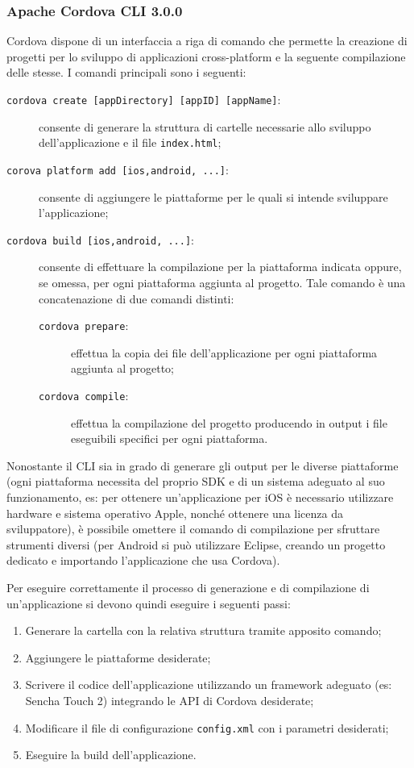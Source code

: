 \subsubsection{Apache Cordova CLI 3.0.0}
Cordova dispone di un interfaccia a riga di comando che permette la creazione di progetti per lo sviluppo di applicazioni cross-platform e la seguente compilazione delle stesse.
I comandi principali sono i seguenti:
\begin{description}
\item[\texttt{cordova create [appDirectory] [appID] [appName]}:] consente di generare la struttura di cartelle necessarie allo sviluppo dell'applicazione e il file \texttt{index.html};
\item[\texttt{corova platform add [ios,android, ...]}:] consente di aggiungere le piattaforme per le quali si intende sviluppare l'applicazione;
\item[\texttt{cordova build [ios,android, ...]}:] consente di effettuare la compilazione per la piattaforma indicata oppure, se omessa, per ogni piattaforma aggiunta al progetto. Tale comando è una concatenazione di due comandi distinti:
	\begin{description}
	\item[\texttt{cordova prepare}:] effettua la copia dei file dell'applicazione per ogni piattaforma aggiunta al progetto;
	\item[\texttt{cordova compile}:] effettua la compilazione del progetto producendo in output i file eseguibili specifici per ogni piattaforma.
	\end{description}
\end{description}

Nonostante il CLI sia in grado di generare gli output per le diverse piattaforme (ogni piattaforma necessita del proprio SDK e di un sistema adeguato al suo funzionamento, es: per ottenere un'applicazione per iOS è necessario utilizzare hardware e sistema operativo Apple, nonché ottenere una licenza da sviluppatore), è possibile omettere il comando di compilazione per sfruttare strumenti diversi (per Android si può utilizzare Eclipse, creando un progetto dedicato e importando l'applicazione che usa Cordova).

Per eseguire correttamente il processo di generazione e di compilazione di un'applicazione si devono quindi eseguire i seguenti passi:
\begin{enumerate}
\item Generare la cartella con la relativa struttura tramite apposito comando;
\item Aggiungere le piattaforme desiderate;
\item Scrivere il codice dell'applicazione utilizzando un framework adeguato (es: Sencha Touch 2) integrando le API di Cordova desiderate;
\item Modificare il file di configurazione \texttt{config.xml} con i parametri desiderati;
\item Eseguire la build dell'applicazione.
\end{enumerate}

